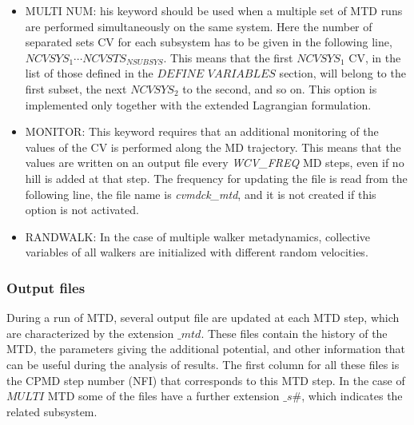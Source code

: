\documentclass[twoside,10pt,titlepage,a4paper]{article}
\begin{document}
\begin{itemize}
\item{MULTI NUM:} his keyword should be used when a multiple set of
MTD runs are performed simultaneously on the same system. Here the
number of separated sets CV for each subsystem has to be given in
the following line, $NCVSYS_1 \cdots NCVSTS_{NSUBSYS}$.
This means that the first $NCVSYS_1$ CV, in the list of those
defined in the $DEFINE $ $ VARIABLES$ section, will belong to
the first subset, the next  $NCVSYS_2$ to the second,  and so on.
This option is implemented only together with the extended
Lagrangian formulation.

\item{MONITOR: } This keyword requires that an additional monitoring of the values
of the CV is performed along the MD trajectory. This means that the values are written
on an output file every {\it WCV\_FREQ} MD steps, even if no hill is added at that step.
The frequency for updating the file is read from the following line, the file name is
{\it cvmdck\_mtd}, and it is not created if this option is not activated.

\item{RANDWALK: } In the case of multiple walker metadynamics, collective variables of
all walkers are initialized with different random velocities. 

\end{itemize}

\subsubsection{Output files}
\label{sub:outmtd}
During a run of MTD, several output file are updated at each MTD step,
which are characterized by the extension $\_mtd$. These files contain
the history of the MTD, the parameters giving the additional potential,
and other information that can be useful during the analysis of results.
The first column for all these files is the CPMD step number (NFI) that
corresponds to this MTD step.
In the case of $MULTI$ MTD some of the files have a further extension
$\_s\#$, which indicates the related subsystem.
\end{document}
